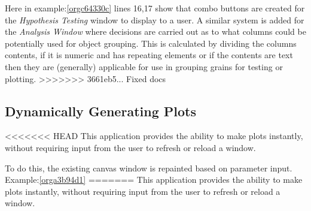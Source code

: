 \documentclass[11pt]{report}
\begin{document}
Here in example:\ref{orgc64330c} lines 16,17 show that combo buttons are created for the \emph{Hypothesis Testing} window to display to a user. A similar system is added for the \emph{Analysis Window} where decisions are carried out as to what columns could be potentially used for object grouping. This is calculated by dividing the columns contents, if it is numeric and has repeating elements or if the contents are text then they are (generally) applicable for use in grouping grains for testing or plotting.
>>>>>>> 3661eb5... Fixed docs

\begin{listing}[htbp]
\begin{verbatim}
class TestWindowView():
    def __init__(self,df,ui,plot_type):
        """
        Given a dataframe and a layout spec
        this class populates appropriate radio button functionality
        """
        self.df = df
        self.ui = ui
        self.plot_type = plot_type
        self.ui.cb_test_grouping.clear()
        self.ui.cb_test_attribute.clear()
        # Line up attributes
        self.ui.cb_test_attribute.addItems(list(
            filter(lambda x: is_numeric_dtype(df[x]), df.columns)))

        # Find groups
        self.ui.cb_test_grouping.addItems(
            self.find_candidates_for_grouping(self.df))

    def find_candidates_for_grouping(self, df):
        lst = []
        for c in df.columns:
            if len(df[c].unique()) < 30:
                if not is_numeric_dtype(df[c]):
                    lst.append(c)
        return lst
\end{verbatim}
<<<<<<< HEAD
\caption{\label{orgd214bbf}
=======
\caption{\label{orgc64330c}
>>>>>>> 3661eb5... Fixed docs
The Hypothesis Testing Window class}
\end{listing}

\subsection{Dynamically Generating Plots}
<<<<<<< HEAD
\label{sec:org47d3906}
This application provides the ability to make plots instantly, without requiring input from the user to refresh or reload a window.

To do this, the existing canvas window is repainted based on parameter input. Example:\ref{orga3b94d1}
=======
\label{sec:orgfab124e}
This application provides the ability to make plots instantly, without requiring input from the user to refresh or reload a window.
\end{document}

